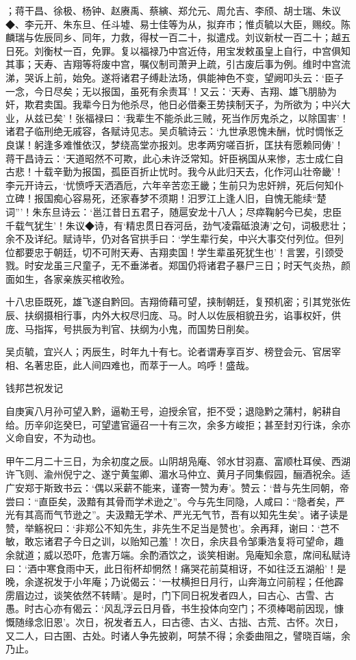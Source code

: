 \documentclass[]{article}
\begin{document}
；蒋干昌、徐极、杨钟、赵赓禹、蔡縯、郑允元、周允吉、李颀、胡士瑞、朱议◆、李元开、朱东旦、任斗墟、易士佳等为从，拟弃市；惟贞毓以大臣，赐绞。陈麟瑞与佐辰同乡、同年，力救，得杖一百二十，拟遣戍。刘议新杖一百二十；越五日死。刘衡杖一百，免罪。复以福禄乃中宫近侍，用宝发敕虽皇上自行，中宫俱知其事；天寿、吉翔等将废中宫，嘱仪制司萧尹上疏，引古废后事为例。维时中宫流涕，哭诉上前，始免。遂将诸君子缚赴法场，俱能神色不变，望阙叩头云：`臣子一念，今日尽矣；无以报国，虽死有余责耳'！又云：`天寿、吉翔、雄飞朋胁为奸，欺君卖国。我辈今日为他杀尽，他日必借秦王势挟制天子，为所欲为；中兴大业，从兹已矣'！张福禄曰：`我辈生不能杀此三贼，死当作厉鬼杀之，以除国害'！诸君子临刑绝无戚容，各赋诗见志。吴贞毓诗云：`九世承恩愧未酬，忧时惆怅乏良谋！躬逢多难惟依汉，梦绕高堂亦报刘。忠孝两穷嗟百折，匡扶有愿赖同俦'！蒋干昌诗云：`天道昭然不可欺，此心未许泛常知。奸臣祸国从来惨，志士成仁自古悲！十载辛勤为报国，孤臣百折止忧时。我今从此归天去，化作河山壮帝畿'！李元开诗云，`忧愤呼天洒酒卮，六年辛苦恋王畿；生前只为忠奸辨，死后何知仆立碑！报国痴心容易死，还家春梦不须期！汨罗江上逢人旧，自愧无能续``楚词'''！朱东旦诗云：`邕江昔日五君子，随扈安龙十八人；尽瘁鞠躬今已矣，忠臣千载气犹生'！朱议◆诗，有`精忠贯日吞河岳，劲气凌霜砥浪涛'之句，词极悲壮；余不及详纪。赋诗毕，仍对各官拱手曰：`学生辈行矣，中兴大事交付列位。但列位都要忠于朝廷，切不可附天寿、吉翔卖国！学生辈虽死犹生也'！言罢，引颈受戮。时安龙虽三尺童子，无不垂涕者。郑国仍将诸君子暴尸三日；时天气炎热，颜面如生，各家亲族买棺收殓。

十八忠臣既死，雄飞遂自黔回。吉翔倚藉可望，挟制朝廷，复预机密；引其党张佐辰、扶纲摄相行事，内外大权尽归庞、马。时人以佐辰相貌丑劣，谄事权奸，供庞、马指挥，号拱辰为判官、扶纲为小鬼，而国势日削矣。

吴贞毓，宜兴人；丙辰生，时年九十有七。论者谓寿享百岁、榜登会元、官居宰相、名著忠臣，此人间四难也，而萃于一人。呜呼！盛哉。

钱邦芑祝发记

自庚寅八月孙可望入黔，逼勒王号，迫授余官，拒不受；退隐黔之蒲村，躬耕自给。历辛卯迄癸巳，可望遣官逼召一十有三次，余多方峻拒；甚至封刃行诛，余亦义命自安，不为动也。

甲午二月二十三日，为余初度之辰。山阴胡凫庵、邻水甘羽嘉、富顺杜耳侯、西湖许飞则、渝州倪宁之、遂宁黄玺卿、湄水马仲立、黄月子同集假园，酾酒祝余。适广安郑于斯致书云：`偶以采薪不能来，谨寄一赞为寿'。赞云：`昔与先生同朝，帝尝曰：``直臣矣，汲黯有其骨而学术逊之''。今与先生同隐，人咸曰：``隐者矣，严光有其高而气节逊之''。夫汲黯无学术、严光无气节，吾有以知先生矣'。诸子读是赞，举觞祝曰：`非郑公不知先生，非先生不足当是赞也'。余再拜，谢曰：`芑不敏，敢忘诸君子今日之训，以贻知己羞'！次日，余庆县令邹秉浩复将可望命，趣余就道；威以恐吓，危害万端。余酌酒饮之，谈笑相谢。凫庵知余意，席间私赋诗曰：`酒中寒食雨中天，此日衔杯却惘然！痛哭花前莫相讶，不如往泛五湖船'！是晚，余遂祝发于小年庵；乃说偈云：`一杖横担日月行，山奔海立问前程；任他霹雳眉边过，谈笑依然不转睛'。是时，门下同日祝发者四人，曰古心、古雪、古愚。时古心亦有偈云：`风乱浮云日月昏，书生投体向空门；不须棒喝前因现，慷慨随缘念旧恩'。次日，祝发者五人，曰古德、古义、古拙、古荒、古怀。次日，又二人，曰古圉、古处。时诸人争先披剃，呵禁不得；余委曲阻之，譬晓百端，余乃止。
\end{document}
